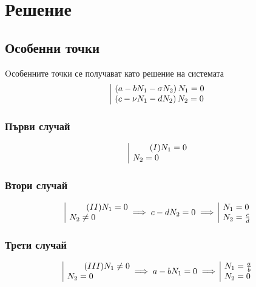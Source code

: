 \documentclass[a4paper,fleqn,12pt]{article}
\begin{document}
\newpage
\section{Решение}
\subsection{Особенни точки}
Oсобенните точки се получават като решение на системата
\begin{gather*}
		\begin{array}{|l@{}}
		\left(a - bN_1 - \sigma N_2 \right) N_1 = 0\\
		\left(c - \nu N_1 - d N_2 \right) N_2 = 0 \\
		\end{array}
\end{gather*}

\subsubsection{Първи случай}
\begin{gather*}
	\begin{array}{|l@{}}\tag{$I$}
		 N_1 = 0\\
		 N_2 = 0 \\
	\end{array}
\end{gather*}
\subsubsection{Втори случай}
\begin{gather*}
	\begin{array}{|l@{}}\tag{$II$}
		 N_1 = 0\\
		 N_2 \neq 0 \\
	\end{array} \implies c - dN_2 = 0 \implies 
	\begin{array}{|l@{}}
		 N_1 = 0\\
		 N_2 = \frac{c}{d}
	\end{array}
\end{gather*}
\subsubsection{Трети случай}
\begin{gather*}
	\begin{array}{|l@{}}\tag{$III$}
		 N_1 \neq 0\\
		 N_2 = 0 \\
	\end{array} \implies a- bN_1 = 0 \implies 
	\begin{array}{|l@{}}
		 N_1 = \frac{a}{b}\\
		 N_2 = 0
	\end{array} 
\end{gather*}
\end{document}
